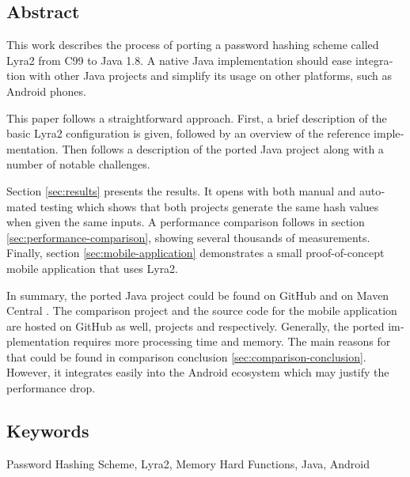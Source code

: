 \cleardoublepage
{}

\begin{otherlanguage}{english}
\chapter*{Abstract}

This work describes the process of porting a password hashing scheme called Lyra2 from C99 to Java 1.8. A native Java implementation should ease integration with other Java projects and simplify its usage on other platforms, such as Android phones.

This paper follows a straightforward approach. First, a brief description of the basic Lyra2 configuration is given, followed by an overview of the reference implementation. Then follows a description of the ported Java project along with a number of notable challenges.

Section \ref{sec:results} presents the results. It opens with both manual and automated testing which shows that both projects generate the same hash values when given the same inputs. A performance comparison follows in section \ref{sec:performance-comparison}, showing several thousands of measurements. Finally, section \ref{sec:mobile-application} demonstrates a small proof-of-concept mobile application that uses Lyra2.

In summary, the ported Java project could be found on GitHub \cite{github:2017:lyra2-java} and on Maven Central \cite{maven:2017:lyra2}. The comparison project and the source code for the mobile application are hosted on GitHub as well, projects \cite{github:2017:lyra2-compare} and \cite{github:2017:lyra2-mobile} respectively. Generally, the ported implementation requires more processing time and memory. The main reasons for that could be found in comparison conclusion \ref{sec:comparison-conclusion}. However, it integrates easily into the Android ecosystem which may justify the performance drop.

\bigskip

\section*{Keywords}
Password Hashing Scheme, Lyra2, Memory Hard Functions, Java, Android

\end{otherlanguage}
